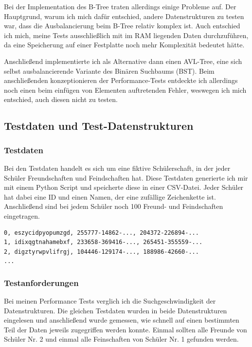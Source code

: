 \documentclass[11pt,a4paper]{article}
\begin{document}
Bei der Implementation des B-Tree traten allerdings einige Probleme auf.
Der Hauptgrund, warum ich mich dafür entschied, andere Datenstrukturen
zu testen war, dass die Ausbalancierung beim B-Tree relativ komplex ist.
Auch entschied ich mich, meine Tests ausschließlich mit im RAM liegenden Daten
durchzuführen, da eine Speicherung auf einer Festplatte noch mehr Komplexität bedeutet
hätte.

\vspace*{0.5cm}

Anschließend implementierte ich als Alternative dann einen AVL-Tree, eine sich selbst
ausbalancierende Variante des Binären Suchbaums (BST). Beim anschließenden
konzeptionieren der Performance-Tests entdeckte ich allerdings noch einen
beim einfügen von Elementen auftretenden Fehler, weswegen ich mich entschied,
auch diesen nicht zu testen.

\clearpage

\subsection{Testdaten und Test-Datenstrukturen}

\subsubsection{Testdaten}

Bei den Testdaten handelt es sich um eine fiktive Schülerschaft, in der jeder
Schüler Freundschaften und Feindschaften hat. Diese Testdaten generierte ich mir
mit einem Python Script und speicherte diese in einer CSV-Datei.
Jeder Schüler hat dabei eine ID und einen Namen, der eine zufällige Zeichenkette ist.
Anschließend sind bei jedem Schüler noch 100 Freund- und Feindschaften eingetragen.

\begin{lstlisting}
0, eszycidpyopumzgd, 255777-14862-..., 204372-226894-...
1, idixqgtnahamebxf, 233658-369416-..., 265451-355559-...
2, digztyrwpvlifrgj, 104446-129174-..., 188986-42660-...
...
\end{lstlisting}

\subsubsection{Testanforderungen}

Bei meinen Performance Tests verglich ich die Suchgeschwindigkeit der Datenstrukturen.
Die gleichen Testdaten wurden in beide Datenstrukturen eingelesen und anschließend
wurde gemessen, wie schnell auf einen bestimmten Teil der Daten jeweils zugegriffen
werden konnte. Einmal sollten alle Freunde von Schüler Nr. 2 und einmal alle
Feinschaften von Schüler Nr. 1 gefunden werden.
\end{document}
